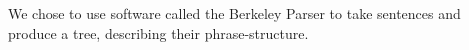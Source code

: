 We chose to use software called the Berkeley Parser to take sentences and produce a tree, describing their phrase-structure.
